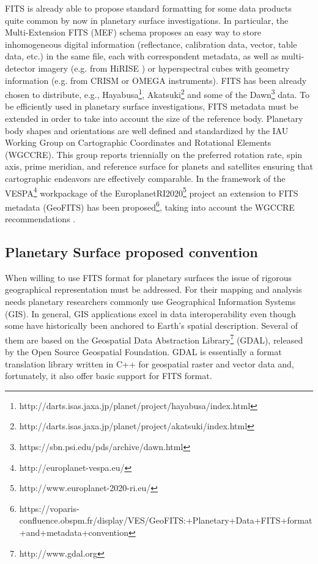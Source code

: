 FITS is already able to propose standard formatting for some data products
quite common by now in planetary surface investigations.
In particular, the Multi-Extension FITS (MEF) schema proposes an easy way
to store inhomogeneous digital information (reflectance, calibration data,
vector, table data, etc.) in the same file, each with correspondent metadata,
as well as multi-detector imagery (e.g. from HiRISE \citep{hirise})
or hyperspectral cubes with geometry information (e.g. from CRISM
\citep{crism} or OMEGA \citep{omega} instruments).
FITS has been already chosen to distribute, e.g.,
Hayabusa\footnote{http://darts.isas.jaxa.jp/planet/project/hayabusa/index.html},
Akatsuki\footnote{http://darts.isas.jaxa.jp/planet/project/akatsuki/index.html}
and some of the Dawn\footnote{https://sbn.psi.edu/pds/archive/dawn.html} data.
To be efficiently used in planetary surface investigations, FITS metadata must
be extended in order to take into account the size of the reference body.
Planetary body shapes and orientations are well defined and standardized by
the IAU Working Group on Cartographic Coordinates and Rotational Elements
(WGCCRE).
This group reports triennially \citep{wgccre} on the preferred rotation rate,
spin axis, prime meridian, and reference surface for planets and satellites
ensuring that cartographic endeavors are effectively comparable.
In the framework of the VESPA\footnote{http://europlanet-vespa.eu/}
\citep{vespapss} workpackage of the EuroplanetRI2020\footnote{http://www.europlanet-2020-ri.eu/}
project an extension to FITS metadata (GeoFITS) has been
proposed\footnote{https://voparis-confluence.obspm.fr/display/VES/GeoFITS:+Planetary+Data+FITS+format+and+metadata+convention},
taking into account the WGCCRE recommendations \citep{MarmoLPSC}.

\subsection{Planetary Surface proposed convention}
\label{ssec:geofits}
When willing to use FITS format for planetary surfaces the issue of rigorous
geographical representation must be addressed.
For their mapping and analysis needs planetary researchers commonly use
Geographical Information Systems (GIS).
In general, GIS applications excel in data interoperability even
though some have historically been anchored to Earth's spatial description.
Several of them are based on the Geospatial Data Abstraction
Library\footnote{http://www.gdal.org} (GDAL), released by the Open Source
Geospatial Foundation.
GDAL is essentially a format translation library written in C++ for geospatial raster
and vector data and, fortunately, it also offer basic support for FITS format.

